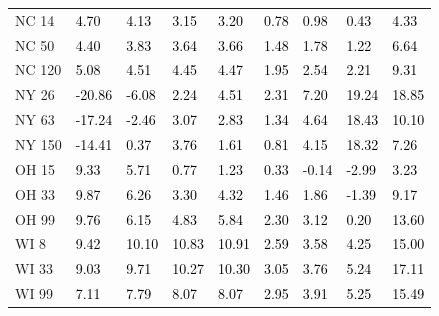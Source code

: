 \begin{tabular}{lllllllll}
NC 14 & \textcolor{black}{ 4.70 } & \textcolor{black}{ 4.13 } & \textcolor{black}{ 3.15 } & \textcolor{black}{ 3.20 } & \textcolor{black}{ 0.78 } & \textcolor{black}{ 0.98 } & \textcolor{black}{ 0.43 } & \textcolor{black}{ 4.33 } \\
NC 50 & \textcolor{black}{ 4.40 } & \textcolor{black}{ 3.83 } & \textcolor{black}{ 3.64 } & \textcolor{black}{ 3.66 } & \textcolor{black}{ 1.48 } & \textcolor{black}{ 1.78 } & \textcolor{black}{ 1.22 } & \textcolor{black}{ 6.64 } \\
NC 120 & \textcolor{black}{ 5.08 } & \textcolor{black}{ 4.51 } & \textcolor{black}{ 4.45 } & \textcolor{black}{ 4.47 } & \textcolor{black}{ 1.95 } & \textcolor{black}{ 2.54 } & \textcolor{black}{ 2.21 } & \textcolor{black}{ 9.31 } \\
NY 26 & \textcolor{black}{ -20.86 } & \textcolor{black}{ -6.08 } & \textcolor{black}{ 2.24 } & \textcolor{black}{ 4.51 } & \textcolor{black}{ 2.31 } & \textcolor{black}{ 7.20 } & \textcolor{black}{ 19.24 } & \textcolor{black}{ 18.85 } \\
NY 63 & \textcolor{black}{ -17.24 } & \textcolor{black}{ -2.46 } & \textcolor{black}{ 3.07 } & \textcolor{black}{ 2.83 } & \textcolor{black}{ 1.34 } & \textcolor{black}{ 4.64 } & \textcolor{black}{ 18.43 } & \textcolor{black}{ 10.10 } \\
NY 150 & \textcolor{black}{ -14.41 } & \textcolor{black}{ 0.37 } & \textcolor{black}{ 3.76 } & \textcolor{black}{ 1.61 } & \textcolor{black}{ 0.81 } & \textcolor{black}{ 4.15 } & \textcolor{black}{ 18.32 } & \textcolor{black}{ 7.26 } \\
OH 15 & \textcolor{black}{ 9.33 } & \textcolor{black}{ 5.71 } & \textcolor{black}{ 0.77 } & \textcolor{black}{ 1.23 } & \textcolor{black}{ 0.33 } & \textcolor{black}{ -0.14 } & \textcolor{black}{ -2.99 } & \textcolor{black}{ 3.23 } \\
OH 33 & \textcolor{black}{ 9.87 } & \textcolor{black}{ 6.26 } & \textcolor{black}{ 3.30 } & \textcolor{black}{ 4.32 } & \textcolor{black}{ 1.46 } & \textcolor{black}{ 1.86 } & \textcolor{black}{ -1.39 } & \textcolor{black}{ 9.17 } \\
OH 99 & \textcolor{black}{ 9.76 } & \textcolor{black}{ 6.15 } & \textcolor{black}{ 4.83 } & \textcolor{black}{ 5.84 } & \textcolor{black}{ 2.30 } & \textcolor{black}{ 3.12 } & \textcolor{black}{ 0.20 } & \textcolor{black}{ 13.60 } \\
WI 8 & \textcolor{black}{ 9.42 } & \textcolor{black}{ 10.10 } & \textcolor{black}{ 10.83 } & \textcolor{black}{ 10.91 } & \textcolor{black}{ 2.59 } & \textcolor{black}{ 3.58 } & \textcolor{black}{ 4.25 } & \textcolor{black}{ 15.00 } \\
WI 33 & \textcolor{black}{ 9.03 } & \textcolor{black}{ 9.71 } & \textcolor{black}{ 10.27 } & \textcolor{black}{ 10.30 } & \textcolor{black}{ 3.05 } & \textcolor{black}{ 3.76 } & \textcolor{black}{ 5.24 } & \textcolor{black}{ 17.11 } \\
WI 99 & \textcolor{black}{ 7.11 } & \textcolor{black}{ 7.79 } & \textcolor{black}{ 8.07 } & \textcolor{black}{ 8.07 } & \textcolor{black}{ 2.95 } & \textcolor{black}{ 3.91 } & \textcolor{black}{ 5.25 } & \textcolor{black}{ 15.49 } \\
\bottomrule
\end{tabular}
